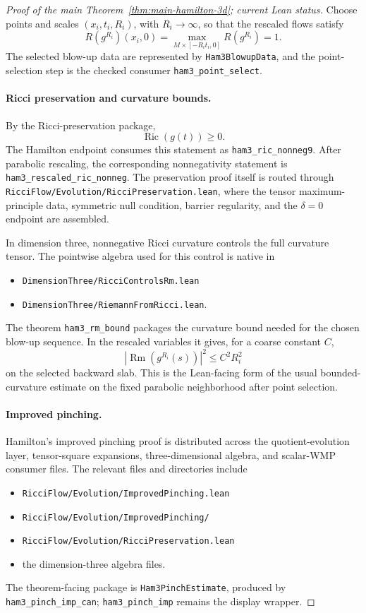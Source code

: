\documentclass[11pt]{article}
\theoremstyle{plain}
\theoremstyle{definition}
\theoremstyle{remark}
\newcommand{\Ric}{\operatorname{Ric}}
\newcommand{\Rm}{\operatorname{Rm}}
\newcommand{\norm}[1]{\left|#1\right|}
\newcommand{\leanref}[1]{\nolinkurl{#1}}
\newcommand{\leanfile}[1]{\nolinkurl{#1}}
\newcommand{\rffile}[1]{\leanfile{#1}}
\newcommand{\rfdir}[1]{\leanfile{#1/}}
\begin{document}
\begin{proof}[Proof of the main Theorem~\ref{thm:main-hamilton-3d}; current Lean status]
Choose points and scales \((x_i,t_i,R_i)\), with \(R_i\to\infty\), so that the
rescaled flows satisfy
\[
R(g^{R_i})(x_i,0)=
\max_{M\times[-R_it_i,0]}R(g^{R_i})=1.
\]
The selected blow-up data are represented by \leanref{Ham3BlowupData}, and the
point-selection step is the checked consumer \leanref{ham3_point_select}.

\paragraph{Ricci preservation and curvature bounds.}
By the Ricci-preservation package,
\[
\Ric(g(t))\ge0.
\]
The Hamilton endpoint consumes this statement as \leanref{ham3_ric_nonneg9}.
After parabolic rescaling, the corresponding nonnegativity statement is
\leanref{ham3_rescaled_ric_nonneg}.  The preservation proof itself is routed
through \rffile{RicciFlow/Evolution/RicciPreservation.lean}, where the tensor
maximum-principle data, symmetric null condition, barrier regularity, and the
\(\delta=0\) endpoint are assembled.

In dimension three, nonnegative Ricci curvature controls the full curvature
tensor.  The pointwise algebra used for this control is native in
\begin{itemize}[leftmargin=2em]
  \item \rffile{DimensionThree/RicciControlsRm.lean}
  \item \rffile{DimensionThree/RiemannFromRicci.lean}.
\end{itemize}
The theorem \leanref{ham3_rm_bound} packages the curvature bound needed for the
chosen blow-up sequence.  In the rescaled variables it gives, for a coarse
constant \(C\),
\[
\norm{\Rm(g^{R_i}(s))}^2 \le C^2 R_i^2
\]
on the selected backward slab.  This is the Lean-facing form of the usual
bounded-curvature estimate on the fixed parabolic neighborhood after point
selection.

\paragraph{Improved pinching.}
Hamilton's improved pinching proof is distributed across the quotient-evolution
layer, tensor-square expansions, three-dimensional algebra, and scalar-WMP
consumer files.  The relevant files and directories include
\begin{itemize}[leftmargin=2em]
  \item \rffile{RicciFlow/Evolution/ImprovedPinching.lean}
  \item \rfdir{RicciFlow/Evolution/ImprovedPinching}
  \item \rffile{RicciFlow/Evolution/RicciPreservation.lean}
  \item the dimension-three algebra files.
\end{itemize}
The theorem-facing package is \leanref{Ham3PinchEstimate}, produced by
\leanref{ham3_pinch_imp_can}; \leanref{ham3_pinch_imp} remains the display
wrapper.


\end{proof}
\end{document}

